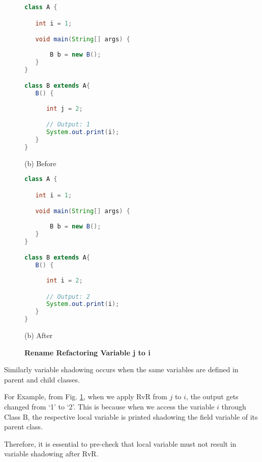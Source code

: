 \begin{figure}[th]
\centering
\begin{minipage}[t]{0.47\linewidth}
\begin{lstlisting}[language=java, basicstyle=\scriptsize\ttfamily,frame=single]
class A {

   int i = 1;

   void main(String[] args) {
		
       B b = new B(); 
   }
}

class B extends A{
   B() {
    	
      int j = 2;

      // Output: 1
      System.out.print(i); 
   }
}
\end{lstlisting}
\centering(b) Before 
\end{minipage}
\hfill
\begin{minipage}[t]{0.47\linewidth}
\begin{lstlisting}[language=java, basicstyle=\scriptsize\ttfamily,frame=single]
class A {

   int i = 1;

   void main(String[] args) {
		
       B b = new B(); 
   }
}

class B extends A{
   B() {
    	
      int i = 2;

      // Output: 2
      System.out.print(i); 
   }
}
\end{lstlisting}
\centering(b) After 
\end{minipage}
\caption{\textbf{Rename Refactoring Variable j to i}}
\label{figure:precond5_4}
\end{figure}


Similarly variable shadowing occurs when the same variables are defined in parent and child classes.

For Example, from Fig. \ref{figure:precond5_4}, when we apply RvR from $j$ to $i$, the output gets changed from `1' to `2'. This is because when we access the variable $i$ through Class B, the respective local variable is printed shadowing the field variable of its parent class.

Therefore, it is essential to pre-check that local variable must not result in variable shadowing after RvR.